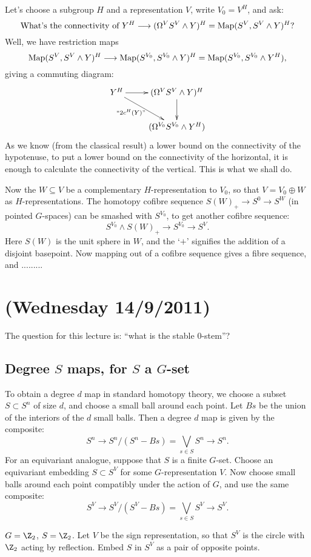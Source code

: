 \documentclass[11pt]{article}
\newcommand{\NewLecture}[3]{\section{#1 {\small(#2/#3/2011)}}}
\begin{document}
Let's choose a subgroup $H$ and a representation $V$, write $V_0=V^H$, and ask:
\[\text{What's the connectivity of }
Y^H\longrightarrow(\Omega^VS^V\wedge Y)^H=\operatorname{Map}(S^V,S^V\wedge Y)^H?\]
Well, we have restriction maps
\[\operatorname{Map}(S^V,S^V\wedge Y)^H\longrightarrow\operatorname{Map}(S^{V_0},S^{V_0}\wedge Y)^H=\operatorname{Map}(S^{V_0},S^{V_0}\wedge Y^H),\]
giving a commuting diagram:
\[\xymatrix{
Y^H\ar[r]\ar[dr]_(.4){\text{``$2c^H(Y)$''}}&(\Omega^VS^V\wedge Y)^H\ar[d]\\
&(\Omega^{V_0}S^{V_0}\wedge Y^H)
}\]
As we know (from the classical result) a lower bound on the connectivity of the hypotenuse, to put a lower bound on the connectivity of the horizontal, it is enough to calculate the connectivity of the vertical. This is what we shall do.

Now the $W\subseteq V$ be a complementary $H$-representation to $V_0$, so that $V=V_0\oplus W$ as $H$-representations. The homotopy cofibre sequence $S(W)_+\to S^0\to S^W$ (in pointed $G$-spaces) can be smashed with $S^{V_0}$, to get another cofibre sequence:
\[S^{V_0}\wedge S(W)_+\to S^{V_0}\to S^V.\]
Here $S(W)$ is the unit sphere in $W$, and the `$+$' signifies the addition of a disjoint basepoint. Now mapping out of a cofibre sequence gives a fibre sequence, and .........

\NewLecture{}{Wednesday 14}{9}
The question for this lecture is: ``what is the stable $0$-stem''?
\subsection*{Degree $S$ maps, for $S$ a $G$-set}
To obtain a degree $d$ map in standard homotopy theory, we choose a subset $S\subset S^n$ of size $d$, and choose a small ball around each point. Let $Bs$ be the union of the interiors of the $d$ small balls. Then a degree $d$ map is given by the composite:
\[S^n\to S^n/(S^n-Bs)=\textstyle{\bigvee}_{\!s\in S}S^n\to S^n.\]
For an equivariant analogue, suppose that $S$ is a finite $G$-set. Choose an equivariant embedding $S\subset S^V$ for some $G$-representation $V$. Now choose small balls around each point compatibly under the action of $G$, and use the same composite: 
\[S^V\to S^V/(S^V-Bs)=\textstyle{\bigvee}_{\!s\in S}S^V\to S^V.\]
\begin{exmp*}
$G=\Z_2$, $S=\Z_2$. Let $V$ be the sign representation, so that $S^V$ is the circle with $\Z_2$ acting by reflection. Embed $S$ in $S^V$ as a pair of opposite points.
\end{exmp*}
\end{document}
